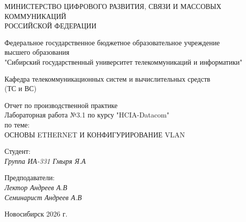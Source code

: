 \thispagestyle{empty}

\begin{center}
    МИНИСТЕРСТВО ЦИФРОВОГО РАЗВИТИЯ, СВЯЗИ И МАССОВЫХ КОММУНИКАЦИЙ \\ РОССИЙСКОЙ ФЕДЕРАЦИИ

    \vspace{20pt}

    Федеральное государственное бюджетное образовательное учреждение  \\  высшего образования \\
    "Сибирский государственный университет телекоммуникаций и информатики" \\

    \vspace{20pt}

    Кафедра телекоммуникационных систем и вычислительных средств \\  (ТС и ВС)
\end{center}

\vfill

\begin{center}
    Отчет по производственной практике \\  
    Лабораторная работа №3.1 по курсу "HCIA-Datacom"\\
    \vspace{20pt}
    по теме: \\
    \uppercase{Основы Ethernet и конфигурирование VLAN}
\end{center}

\vfill

    \noindent Студент: \\
    \textit{Группа ИА-331 \hfill Гмыря Я.А} 

    \vspace{20pt}
 
    \noindent Предподаватели: \\
    \textit{Лектор \hfill Андреев А.В} \\
    \textit{Семинарист \hfill Андреев А.В}

\vfill

\begin{center}
    Новосибирск 2026 г.
\end{center}